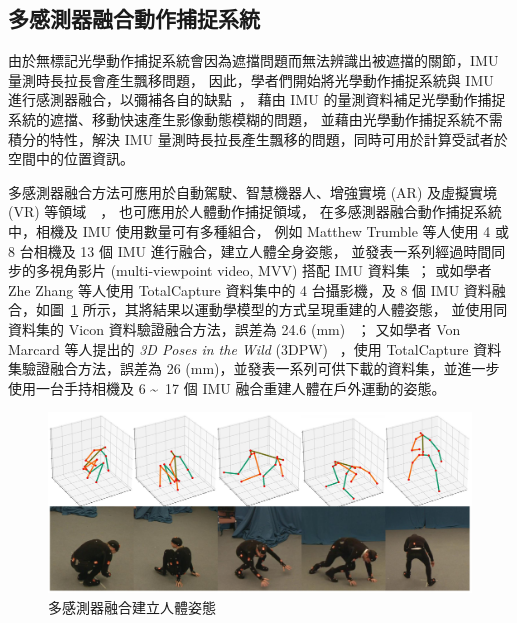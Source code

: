 \clearpage

\subsection{多感測器融合動作捕捉系統}
由於無標記光學動作捕捉系統會因為遮擋問題而無法辨識出被遮擋的關節，IMU 量測時長拉長會產生飄移問題，
因此，學者們開始將光學動作捕捉系統與 IMU 進行感測器融合，以彌補各自的缺點~\cite{li2023visual}，
藉由 IMU 的量測資料補足光學動作捕捉系統的遮擋、移動快速產生影像動態模糊的問題，
並藉由光學動作捕捉系統不需積分的特性，解決 IMU 量測時長拉長產生飄移的問題，同時可用於計算受試者於空間中的位置資訊。

多感測器融合方法可應用於自動駕駛、智慧機器人、增強實境 (AR) 及虛擬實境 (VR) 等領域~\cite{jinyu2019survey}~\cite{zhu2023camera}，
也可應用於人體動作捕捉領域，
在多感測器融合動作捕捉系統中，相機及 IMU 使用數量可有多種組合，
例如 Matthew Trumble 等人使用 4 或 8 台相機及 13 個 IMU 進行融合，建立人體全身姿態，
並發表一系列經過時間同步的多視角影片 (multi-viewpoint video, MVV) 搭配 IMU 資料集~\cite{Trumble:BMVC:2017}；
或如學者 Zhe Zhang 等人使用 TotalCapture 資料集中的 4 台攝影機，及 8 個 IMU 資料融合，如圖~\ref{ch2_fig_fusing} 所示，其將結果以運動學模型的方式呈現重建的人體姿態，
並使用同資料集的 Vicon 資料驗證融合方法，誤差為 24.6 (mm) ~\cite{Zhang_2020_CVPR}；
又如學者 Von Marcard 等人提出的 \textit{3D Poses in the Wild} (3DPW) ~\cite{vonMarcard2018}，使用 TotalCapture 資料集驗證融合方法，誤差為 26 (mm)，並發表一系列可供下載的資料集，並進一步使用一台手持相機及 6 \textasciitilde\ 17 個 IMU 融合重建人體在戶外運動的姿態。

\begin{figure}[!ht]
    \centering
    \includegraphics[width=\linewidth]{figure/ch2_fig_fusing.png}
     \caption[多感測器融合建立人體姿態~\cite{Zhang_2020_CVPR}]{多感測器融合建立人體姿態~\cite{Zhang_2020_CVPR}}
     \label{ch2_fig_fusing}
\end{figure}

